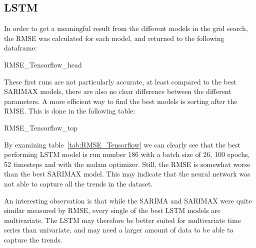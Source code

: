 \subsection{LSTM}\label{sec:lstm}
In order to get a meaningful result from the different models in the grid search, the RMSE was calculated for each model, and returned to the following dataframe:
\begin{table}[H]
    \centering
    \begin{adjustbox}{width=\columnwidth,center}
    {RMSE_Tensorflow_head}
    \end{adjustbox}
    \caption{RMSE for each model in the grid search.}\label{tab:RMSE_Tensorflow_head}
\end{table}
These first runs are not particularly accurate, at least compared to the best SARIMAX models, there are also no clear difference between the different parameters. A more efficient way to find the best models is sorting after the RMSE. This is done in the following table:
\begin{table}[H]
    \centering
    \begin{adjustbox}{width=\columnwidth,center}
    {RMSE_Tensorflow_top}
    \end{adjustbox}
    \caption{RMSE for each model in the grid search sorted after RMSE.}\label{tab:RMSE_Tensorflow}
\end{table}
By examining table~\ref{tab:RMSE_Tensorflow} we can clearly see that the best performing LSTM model is run number 186 with a batch size of 26, 100 epochs, 52 timesteps and with the nadam optimizer. Still, the RMSE is somewhat worse than the best SARIMAX model. This may indicate that the neural network was not able to capture all the trends in the dataset. 

An interesting observation is that while the SARIMA and SARIMAX were quite similar measured by RMSE, every single of the best LSTM models are multivariate. The LSTM may therefore be better suited for multivariate time series than univariate, and may need a larger amount of data to be able to capture the trends. 


